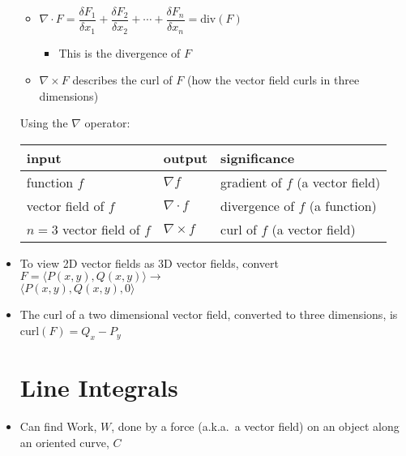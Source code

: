\begin{itemize}
\begin{itemize}
      \item $\nabla \cdot F = \dfrac{\delta F_1}{\delta x_1} + \dfrac{\delta F_2}{\delta x_2} + \cdots + \dfrac{\delta F_n}{\delta x_n} = \text{div}(F)$

        \begin{itemize}

          \item This is the divergence of $F$

        \end{itemize}

      \item $\nabla \times F$ describes the curl of $F$ (how the vector field curls in three dimensions)

    \end{itemize}

    \begin{center}
      Using the $\nabla$ operator:\\
      \begin{tabular}{| l | l | l |}
        \hline
        input & output & significance\\
        \hline
        function $f$ & $\nabla f$ & gradient of $f$ (a vector field)\\
        \hline
        vector field of $f$ & $\nabla\cdot f$ & divergence of $f$ (a function)\\
        \hline
        $n=3$ vector field of $f$ & $\nabla\times f$ & curl of $f$ (a vector field)\\
        \hline
      \end{tabular}
    \end{center}

  \item To view 2D vector fields as 3D vector fields, convert $F=\langle P(x,y), Q(x,y)\rangle\to$\\$\langle P(x,y), Q(x,y), 0 \rangle$

  \item The curl of a two dimensional vector field, converted to three dimensions, is curl$(F) = Q_x-P_y$

    \section{Line Integrals}

  \item Can find Work, $W$, done by a force (a.k.a.\ a vector field) on an object along an oriented curve, $C$


\end{itemize}
